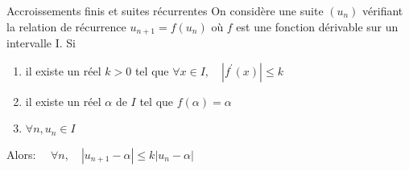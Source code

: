 \documentclass[12pt,a4paper]{article}
\begin{document}
 \begin{rounbox}{Accroissements finis et suites récurrentes}
 On considère une suite $\left(u_n\right)$ vérifiant la relation de récurrence $u_{n+1}=f\left(u_n\right)$ où $f$ est une fonction dérivable sur un intervalle I. Si
 \begin{enumerate}
 \item  il existe un réel $k>0$ tel que $\forall x \in I, \quad\left|f^{\prime}(x)\right| \leq k$
 \item  il existe un réel $\alpha$ de $I$ tel que $f(\alpha)=\alpha$
 \item  $\forall n, u_n \in I$
 \end{enumerate}
 Alors: $\quad \forall n, \quad\left|u_{n+1}-\alpha\right| \leq k\left|u_n-\alpha\right|$
 \end{rounbox}
\end{document}

